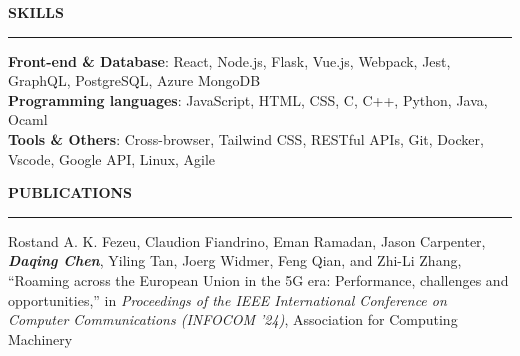 \documentclass{cv}
\newcommand*{\labelfont}{\fontfamily{bch}\selectfont}
\begin{document}
\vspace*{1pt}
{\large {\textbf{SKILLS}}}\vspace*{-6pt}\\
\rule{\textwidth}{0.4pt}
{
{\labelfont \textbf{Front-end \& Database}}: React, Node.js, Flask, Vue.js, Webpack, Jest, GraphQL, PostgreSQL, Azure MongoDB\\
{\labelfont \textbf{Programming languages}}: JavaScript, HTML, CSS, C, C++, Python, Java, Ocaml\\
{\labelfont \textbf{Tools \& Others}}: Cross-browser, Tailwind CSS, RESTful APIs, Git, Docker, Vscode, Google API, Linux, Agile
}

\vspace*{4pt}
{\large {\textbf{PUBLICATIONS}}}\vspace*{-6pt}\\
\rule{\textwidth}{0.4pt}
Rostand A. K. Fezeu, Claudion Fiandrino, Eman Ramadan, Jason Carpenter,\textit{\textbf{ Daqing Chen}}, Yiling Tan, Joerg Widmer, Feng Qian, and Zhi-Li Zhang, ``Roaming across the European Union in the 5G era: Performance, challenges and opportunities,'' in \textit{Proceedings of the IEEE International Conference on Computer Communications (INFOCOM '24)}, Association for Computing Machinery




\end{document}
